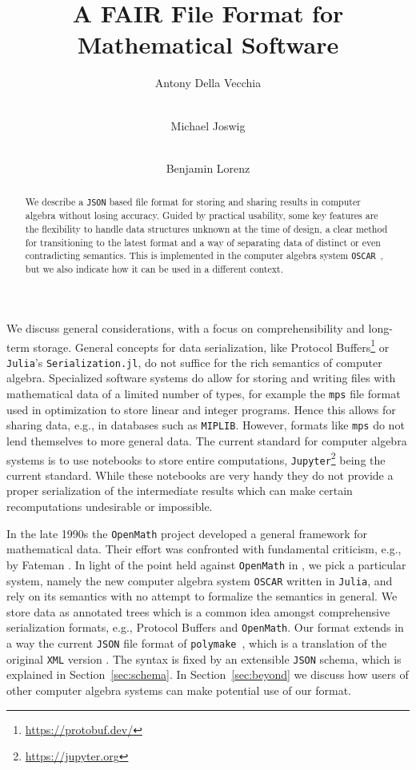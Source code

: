 \documentclass[runningheads]{llncs}
\title{A FAIR File Format for Mathematical Software}
\institute{Technische Universität Berlin, Chair of Discrete Mathematics/Geometry, Berlin, Germany
  \and  Max Planck Institute for Mathematics in the Sciences, Leipzig, Germany}
\author{Antony Della Vecchia\inst{1} \orcidID{0009-0008-1179-9862} \and \\ Michael Joswig\inst{1, 2} \orcidID{0000-0002-4974-9659} \and \\ Benjamin Lorenz\inst{1} \orcidID{0000-0003-2648-718X}}
\newcommand\polymake{\texttt{polymake}\xspace}
\newcommand\OSCAR{\texttt{OSCAR}\xspace}
\newcommand\Julia{\texttt{Julia}\xspace}
\newcommand\JSON{\texttt{JSON}\xspace}
\newcommand\XML{\texttt{XML}\xspace}
\newcommand\OpenMath{\texttt{OpenMath}\xspace}
\newcommand\MIPLIB{\texttt{MIPLIB}\xspace}
\newcommand\Jupyter{\texttt{Jupyter}\xspace}
\begin{document}
\maketitle

\begin{abstract}
We describe a \JSON based file format for storing and sharing results in computer algebra without losing accuracy.
Guided by practical usability, some key features are the flexibility to handle data structures unknown at the time of design,
a clear method for transitioning to the latest format and a way of separating data of distinct or even contradicting semantics.
This is implemented in the computer algebra system \OSCAR~\cite{OSCAR-book,OSCAR}, but we also indicate how it can be used in a different context.
\end{abstract}

We discuss general considerations, with a focus on comprehensibility and long-term storage.
General concepts for data serialization, like Protocol Buffers\footnote{\url{https://protobuf.dev/}} or \Julia's \cite{Julia-2017} \texttt{Serialization.jl}, do not suffice for the rich semantics of computer algebra.
Specialized software systems do allow for storing and writing files with mathematical data of a limited number of types, for example the \texttt{mps} file format used in optimization to
store linear and integer programs.
Hence this allows for sharing data, e.g., in databases such as \MIPLIB \cite{MIPLIB}.
However, formats like \texttt{mps} do not lend themselves to more general data.
The current standard for computer algebra systems is to use notebooks to store entire computations, \Jupyter\footnote{\url{https://jupyter.org}} being the current standard.
While these notebooks are very handy they do not provide a proper serialization of the intermediate results which can make certain recomputations undesirable or impossible.

In the late 1990s the \OpenMath project \cite{OpenMath:2000} developed a general framework for mathematical data.
Their effort was confronted with fundamental criticism, e.g., by Fateman \cite{Fateman:2001,Fateman:MVSD}. In light of the point held against
\OpenMath in \cite{Fateman:2001}, we pick a particular system, namely the new computer algebra system \OSCAR written in \Julia, and
rely on its semantics with no attempt to formalize the semantics in general.
We store data as annotated trees which is a common idea amongst comprehensive serialization formats, e.g., Protocol Buffers and \OpenMath.
Our format extends in a way the current \JSON file format of \polymake~\cite{polymake:2017}, which is a translation of the original \XML version \cite{polymake_XML:ICMS_2016}.
The syntax is fixed by an extensible \JSON schema, which is explained in Section~\ref{sec:schema}.
In Section~\ref{sec:beyond} we discuss how users of other computer algebra systems can make potential use of our format.
\end{document}
